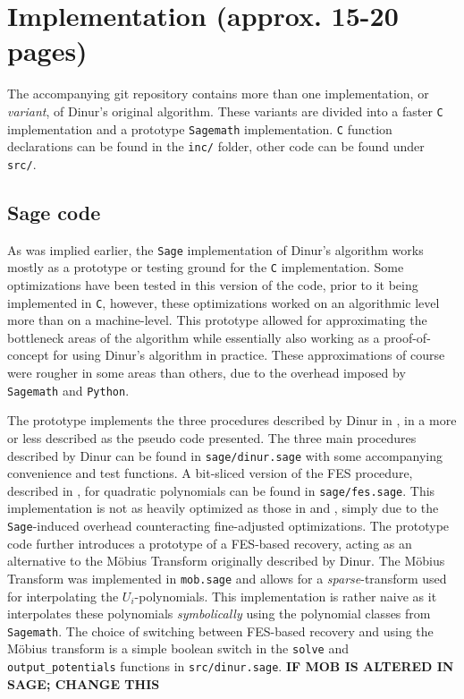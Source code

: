 \section{Implementation (approx. 15-20 pages)} \label{sec:impl}
The accompanying git repository contains more than one implementation, or \textit{variant}, of Dinur's original algorithm. These variants are divided into a faster \texttt{C} implementation and a prototype \texttt{Sagemath} implementation. \texttt{C} function declarations can be found in the \texttt{inc/} folder, other code can be found under \texttt{src/}.

\subsection{Sage code}
As was implied earlier, the \texttt{Sage} implementation of Dinur's algorithm works mostly as a prototype or testing ground for the \texttt{C} implementation. Some optimizations have been tested in this version of the code, prior to it being implemented in \texttt{C}, however, these optimizations worked on an algorithmic level more than on a machine-level. This prototype allowed for approximating the bottleneck areas of the algorithm while essentially also working as a proof-of-concept for using Dinur's algorithm in practice. These approximations of course were rougher in some areas than others, due to the overhead imposed by \texttt{Sagemath} and \texttt{Python}.

The prototype implements the three procedures described by Dinur in \cite{cryptoeprint:2021/578}, in a more or less described as the pseudo code presented. The three main procedures described by Dinur can be found in \texttt{sage/dinur.sage} with some accompanying convenience and test functions. A bit-sliced version of the FES procedure, described in \cite{cryptoeprint:2010/313}, for quadratic polynomials can be found in \texttt{sage/fes.sage}. This implementation is not as heavily optimized as those in \cite{cryptoeprint:2010/313} and \cite{cryptoeprint:2013/436}, simply due to the \texttt{Sage}-induced overhead counteracting fine-adjusted optimizations. The prototype code further introduces a prototype of a FES-based recovery, acting as an alternative to the Möbius Transform originally described by Dinur. The Möbius Transform was implemented in \texttt{mob.sage} and allows for a \textit{sparse}-transform used for interpolating the $U_i$-polynomials. This implementation is rather naive as it interpolates these polynomials \textit{symbolically} using the polynomial classes from \texttt{Sagemath}. The choice of switching between FES-based recovery and using the Möbius transform is a simple boolean switch in the \texttt{solve} and \texttt{output\_potentials} functions in \texttt{src/dinur.sage}. \textbf{IF MOB IS ALTERED IN SAGE; CHANGE THIS} 


